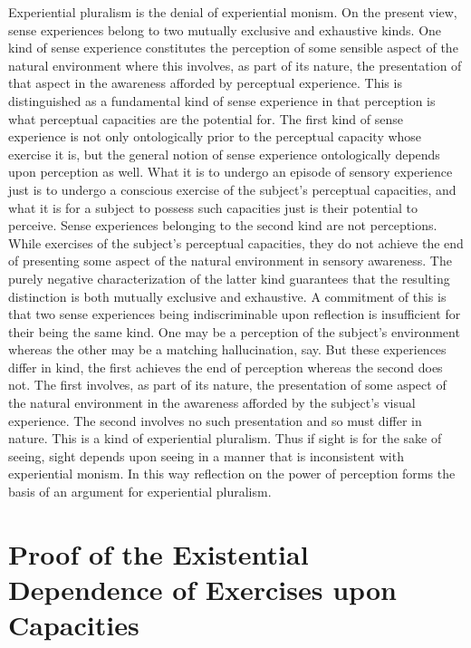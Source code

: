 \documentclass[12pt]{article}
\begin{document}
Experiential pluralism is the denial of experiential monism. On the present view, sense experiences belong to two mutually exclusive and exhaustive kinds. One kind of sense experience constitutes the perception of some sensible aspect of the natural environment where this involves, as part of its nature, the presentation of that aspect in the awareness afforded by perceptual experience. This is distinguished as a fundamental kind of sense experience in that perception is what perceptual capacities are the potential for. The first kind of sense experience is not only ontologically prior to the perceptual capacity whose exercise it is, but the general notion of sense experience ontologically depends upon perception as well. What it is to undergo an episode of sensory experience just is to undergo a conscious exercise of the subject’s perceptual capacities, and what it is for a subject to possess such capacities just is their potential to perceive. Sense experiences belonging to the second kind are not perceptions. While exercises of the subject's perceptual capacities, they do not achieve the end of presenting some aspect of the natural environment in sensory awareness. The purely negative characterization of the latter kind guarantees that the resulting distinction is both mutually exclusive and exhaustive. A commitment of this is that two sense experiences being indiscriminable upon reflection is insufficient for their being the same kind. One may be a perception of the subject's environment whereas the other may be a matching hallucination, say. But these experiences differ in kind, the first achieves the end of perception whereas the second does not. The first involves, as part of its nature, the presentation of some aspect of the natural environment in the awareness afforded by the subject's visual experience. The second involves no such presentation and so must differ in nature. This is a kind of experiential pluralism. Thus if sight is for the sake of seeing, sight depends upon seeing in a manner that is inconsistent with experiential monism. In this way reflection on the power of perception forms the basis of an argument for experiential pluralism.



\appendix
\section{Proof of the Existential Dependence of Exercises upon Capacities} %
\label{sec:appendix}
\end{document}
